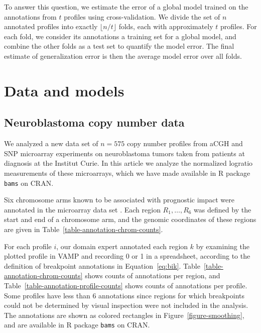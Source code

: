 \documentclass{bioinfo}
\newcommand{\package}[1]{\texttt{#1}}
\begin{document}
\begin{methods}
To answer this question, we estimate the error of a global model
trained on the annotations from $t$ profiles using
cross-validation. We divide the set of $n$ annotated profiles into
exactly $\lfloor n/t \rfloor$ folds, each with approximately $t$
profiles. For each fold, we consider its annotations a training set
for a global model, and combine the other folds as a test set to
quantify the model error. The final estimate of generalization error
is then the average model error over all folds.



\section{Data and models}

\subsection{Neuroblastoma copy number data}\label{data}

We analyzed a new data set of $n=575$ copy number profiles from aCGH
and SNP microarray experiments on neuroblastoma tumors taken from
patients at diagnosis at the Institut Curie. In this article we
analyze the normalized logratio
measurements of these microarrays, which we have made available in R
package \package{bams} on CRAN.




Six chromosome arms known to be associated with prognostic impact were
annotated in the microarray data set \citep{isabelle-2009}. Each
region $R_1,\dots,R_6$ was defined by the start and end of a
chromosome arm, and the genomic coordinates of these regions are given
in Table~\ref{table-annotation-chrom-counts}.

For each profile $i$, our domain expert annotated each region $k$ by
examining the plotted profile in VAMP \citep{vamp} and recording 0 or
1 in a spreadsheet, according to the definition of breakpoint
annotations in Equation~\ref{eq:bik}.
Table~\ref{table-annotation-chrom-counts} shows counts of annotations
per region, and Table~\ref{table-annotation-profile-counts} shows
counts of annotations per profile. Some profiles have less than 6
annotations since regions for which breakpoints could not be
determined by visual inspection were not included in the analysis. The
annotations are shown as colored rectangles in
Figure~\ref{figure-smoothing}, and are available in R package
\package{bams} on CRAN.






\end{methods}
\end{document}
